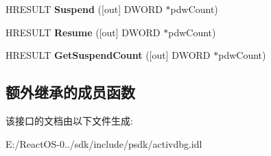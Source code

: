 \begin{DoxyCompactItemize}
\item 
\mbox{\label{interface_i_remote_debug_application_thread_a47e7f3942561c626cbb67ee0679358e9}} 
H\+R\+E\+S\+U\+LT {\bfseries Suspend} (\mbox{[}out\mbox{]} D\+W\+O\+RD $\ast$pdw\+Count)
\item 
\mbox{\label{interface_i_remote_debug_application_thread_a09f06a2f969f18e578d355fd829ab52c}} 
H\+R\+E\+S\+U\+LT {\bfseries Resume} (\mbox{[}out\mbox{]} D\+W\+O\+RD $\ast$pdw\+Count)
\item 
\mbox{\label{interface_i_remote_debug_application_thread_ab77145b68a3a655884f71f23e3b0a2d9}} 
H\+R\+E\+S\+U\+LT {\bfseries Get\+Suspend\+Count} (\mbox{[}out\mbox{]} D\+W\+O\+RD $\ast$pdw\+Count)
\end{DoxyCompactItemize}
\subsection*{额外继承的成员函数}


该接口的文档由以下文件生成\+:\begin{DoxyCompactItemize}
\item 
E\+:/\+React\+O\+S-\/0../sdk/include/psdk/activdbg.\+idl\end{DoxyCompactItemize}
